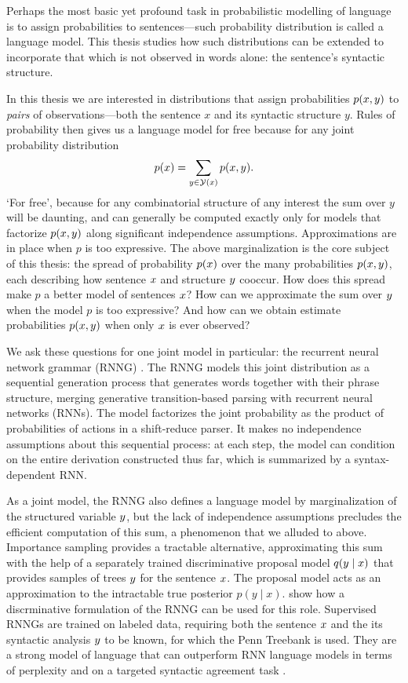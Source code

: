 Perhaps the most basic yet profound task in probabilistic modelling of language is to assign probabilities to sentences---such probability distribution is called a language model. This thesis studies how such distributions can be extended to incorporate that which is not observed in words alone: the sentence's syntactic structure.

In this thesis we are interested in distributions that assign probabilities $p(x, y)$ to \textit{pairs} of observations---both the sentence $x$ and its syntactic structure $y$. Rules of probability then gives us a language model for free because for any joint probability distribution
\begin{align*}
  p(x) = \sum_{y \in \mathcal{Y}(x)} p(x, y).
\end{align*}
`For free', because for any combinatorial structure of any interest the sum over $y$ will be daunting, and can generally be computed exactly only for models that factorize $p(x, y)$ along significant independence assumptions. Approximations are  in place when $p$ is too expressive. The above marginalization is the core subject of this thesis: the spread of probability $p(x)$ over the many probabilities $p(x, y)$, each describing how sentence $x$ and structure $y$ cooccur. How does this spread make $p$ a better model of sentences $x$? How can we approximate the sum over $y$ when the model $p$ is too expressive? And how can we obtain estimate probabilities $p(x, y)$ when only $x$ is ever observed?

We ask these questions for one joint model in particular: the recurrent neural network grammar (RNNG) \citep{dyer2016rnng}. The RNNG models this joint distribution as a sequential generation process that generates words together with their phrase structure, merging generative transition-based parsing with recurrent neural networks (RNNs). The model factorizes the joint probability as the product of probabilities of actions in a shift-reduce parser. It makes no independence assumptions about this sequential process: at each step, the model can condition on the entire derivation constructed thus far, which is summarized by a syntax-dependent RNN.

As a joint model, the RNNG also defines a language model by marginalization of the structured variable $y$, but the lack of independence assumptions precludes the efficient computation of this sum, a phenomenon that we alluded to above. Importance sampling provides a tractable alternative, approximating this sum with the help of a separately trained discriminative proposal model $q(y \mid x)$ that provides samples of trees $y$ for the sentence $x$. The proposal model acts as an approximation to the intractable true posterior $p(y \mid x)$. \citet{dyer2016rnng} show how a discrminative formulation of the RNNG can be used for this role. Supervised RNNGs are trained on labeled data, requiring both the sentence $x$ and the its syntactic analysis $y$ to be known, for which the Penn Treebank \citep{marcus1993penn} is used. They are a strong model of language that can outperform RNN language models in terms of perplexity \citep{dyer2016rnng} and on a targeted syntactic agreement task \citep{kuncoro2018learn}.

